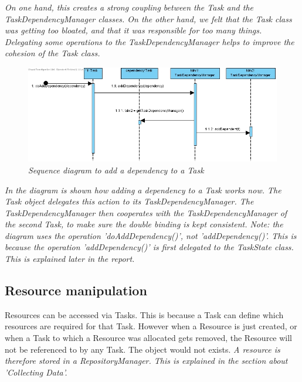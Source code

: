 			\emph{
			On one hand, this creates a strong coupling between the Task and the TaskDependencyManager classes. On the other hand, we felt that the Task class was getting too bloated, and that it was responsible for too many things. Delegating some operations to the TaskDependencyManager helps to improve the cohesion of the Task class.}
			
			\begin{figure}[h]
			\begin{center}
			\includegraphics[scale=0.5]{images/doAddDependency}
			\end{center}
			\caption{\emph{Sequence diagram to add a dependency to a Task}}
			\end{figure}
			
			\emph{
			In the diagram is shown how adding a dependency to a Task works now. The Task object delegates this action
			to its TaskDependencyManager. The TaskDependencyManager then cooperates with the TaskDependencyManager of the second Task, to make sure the double binding is kept consistent.			
			Note: the diagram uses the operation 'doAddDependency()', not 'addDependency()'. This is because the operation 'addDependency()' is first delegated to the TaskState class. This is explained later in the report.}
			
			\subsection{Resource manipulation}
			Resources can be accessed via Tasks. This is because a Task can define which resources are required for that Task.
			However when a Resource is just created, or when a Task to which a Resource was allocated gets removed, the Resource will not be referenced to by any Task. The object would not exists.
			\emph{A resource is therefore stored in a RepositoryManager. This is explained in the section about 'Collecting Data'.}


